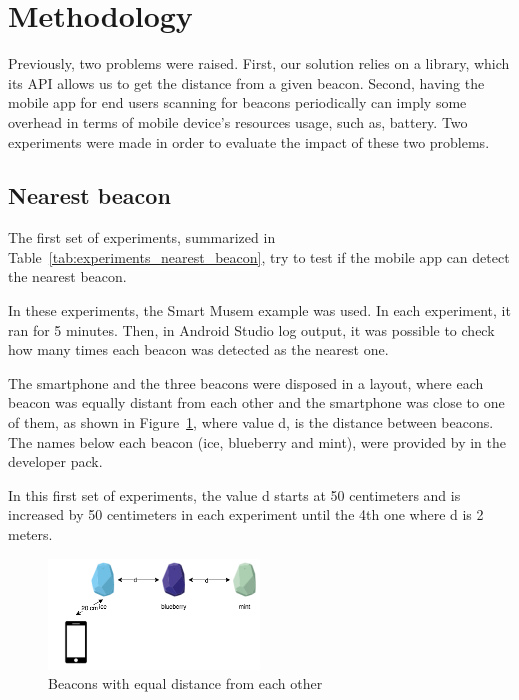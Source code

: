 \section{Methodology}
\label{sec:methodology}
Previously, two problems were raised. First, our solution relies on a library, which its \gls{API} allows us to get the distance from a given beacon.
Second, having the mobile app for end users scanning for beacons periodically can imply some overhead in terms of mobile device's resources usage, such as, battery.
Two experiments were made in order to evaluate the impact of these two problems.

\subsection{Nearest beacon}
\label{sub:methodology_nearest_beacon}
The first set of experiments, summarized in Table~\ref{tab:experiments_nearest_beacon}, try to test if the mobile app can detect the nearest beacon.



In these experiments, the Smart Musem example was used.
In each experiment, it ran for 5 minutes. Then, in Android Studio log output, it was possible to check how many times each beacon was detected as the nearest one.

The smartphone and the three beacons were disposed in a layout, where each beacon was equally distant from each other and the smartphone was close to one of them, as shown in Figure~\ref{fig:layout_experiments_nearest_beacon}, where value d, is the distance between beacons.
The names below each beacon (ice, blueberry and mint), were provided by  in the developer pack.

In this first set of experiments, the value d starts at 50 centimeters and is increased by 50 centimeters in each experiment until the 4th one where d is 2 meters.

\begin{figure}[!ht]
  \centering
    \includegraphics[width=0.5\textwidth, keepaspectratio]{images/nearest_beacon}
    \caption{Beacons with equal distance from each other}
    \label{fig:layout_experiments_nearest_beacon}
\end{figure}

